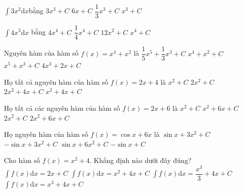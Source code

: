 \begin{ex}
	[Mã 103 - 2020 Lần 2]%
	$\displaystyle\int{3x^2}\mathrm{d}x$$ $bằng
	\choice
	{$ 3x^3+C$}
	{$ 6x+C$}
	{$ $$\dfrac{1}{3}{x^3}+C$}
	{\True $x^3+C$}
\end{ex}
\begin{ex}
	[Mã 104 - 2020 Lần 2]%
	$\displaystyle\int{4x^3\mathrm{d}x}$ bằng
	\choice
	{$4x^4+C$}
	{$\dfrac{1}{4}{x^4}+C$}
	{$12x^2+C$}
	{\True $x^4+C$}
\end{ex}
\begin{ex}
	[Mã 103 2018]%
	Nguyên hàm của hàm số $f(x)=x^4+x^2$ là
	\choice
	{\True $\dfrac{1}{5}{x^5}+\dfrac{1}{3}{x^3}+C$}
	{$x^4+x^2+C$}
	{$x^5+x^3+C$}
	{$4x^3+2x+C$}
\end{ex}
\begin{ex}
	[Mã 104 - 2019]%
	Họ tất cả nguyên hàm của hàm số $ f(x)=2x+4$ là
	\choice
	{$x^2+C$}
	{$ 2x^2+C$}
	{$ 2x^2+4x+C$}
	{\True $x^2+4x+C$}
\end{ex}
\begin{ex}
	[Mã 102 - 2019]%
	Họ tất cả các nguyên hàm của hàm số $ f(x)=2x+6$ là
	\choice
	{$x^2+C$}
	{\True $x^2+6x+C$}
	{$2x^2+C$}
	{$2x^2+6x+C$}
\end{ex}
\begin{ex}
	Họ nguyên hàm của hàm số $ f(x)=\cos x+6x$ là
	\choice
	{\True $\sin x+3x^2+C$}
	{$-\sin x+3x^2+C$}
	{$\sin x+6x^2+C$}
	{$-\sin x+C$}
\end{ex}
\begin{ex}
	[Mã 101 - 2021 - Lần 1]%
	Cho hàm số $ f(x)=x^2+4$. Khẳng định nào dưới đây đúng?
	\choice
	{$\displaystyle\int{f(x)\mathrm{d}x=2x+C}$}
	{$\displaystyle\int{f(x)\mathrm{d}x=x^2+4x+C}$}
	{\True $\displaystyle\int{f(x)\mathrm{d}x=\dfrac{x^3}{3}+4x+C}$}
	{$\displaystyle\int{f(x)\mathrm{d}x=x^3+4x+C}$}
\end{ex}
